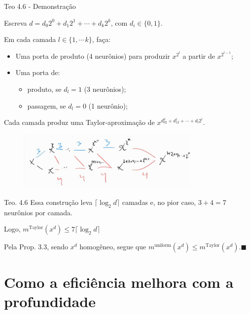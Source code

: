 \documentclass{beamer}
\theoremstyle{definition}
\begin{document}
\begin{frame}{Teo 4.6 - Demonstração}

    Escreva $d = d_0 2^0 + d_1 2^1 + \cdots + d_k 2^k$, com $d_i \in \{0,1\}$. 
    
    \pause Em cada camada $l \in \{1,\cdots\,k\}$, faça:
    \begin{itemize}
        \item Uma porta de produto (4 neurônios) para produzir $x^{2^l}$ a partir de $x^{2^{l-1}}$;
        \item Uma porta de: \pause 
        \begin{itemize}
            \item produto, se $d_l = 1$ (3 neurônios);
            \item passagem, se $d_l =0$ (1 neurônio);
        \end{itemize}
    \end{itemize}
    Cada camada produz uma Taylor-aproximação de $x^{d_02^0 + d_12^1 + \cdots + d_l2^l}$.
    \pause
    \begin{figure}
        \includegraphics[width=0.8\textwidth]{fig/4.6.jpeg}
    \end{figure}
\end{frame}

\begin{frame}{Teo. 4.6}
    Essa construção leva $\lceil \log_2 d \rceil $ camadas e, no pior caso, $3+4=7$ neurônios por camada. \pause 

    \vspace{1em}

    Logo, $m^\text{Taylor}(x^d) \leq 7 \lceil \log_2 d \rceil$ 

    \pause
    \vspace{1em}

    Pela Prop. 3.3, sendo $x^d$ homogêneo, segue que $m^\text{uniform}(x^d) \leq m^\text{Taylor}(x^d). \blacksquare$

\end{frame}

\section{Como a eficiência melhora com a profundidade}
\begin{frame}
    \tableofcontents[currentsection]
\end{frame}
\end{document}
